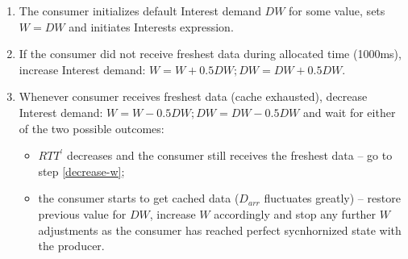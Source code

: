 \documentclass{icn/sig-alternate-2012} %
\newcommand{\wConcept}{Interest demand}
\begin{document}
\begin{enumerate}
\item The consumer initializes default \wConcept{} $DW$ for some value, sets $W=DW$ and initiates Interests expression.
\item If the consumer did not receive freshest data during allocated time (1000ms), increase \wConcept{}: $W=W+0.5DW; DW = DW+0.5DW$.
\item \label{decrease-w} Whenever consumer receives freshest data (cache exhausted), decrease \wConcept{}: $W=W-0.5DW; DW = DW-0.5DW$ and wait for either of the two possible outcomes:
\begin{itemize}
\item $RTT^\prime$ decreases and the consumer still receives the freshest data -- go to step \ref{decrease-w};
\item the consumer starts to get cached data ($D_{arr}$ fluctuates greatly) -- restore previous value for $DW$, increase $W$ accordingly and stop any further $W$ adjustments as the consumer has reached perfect sycnhornized state with the producer.
\end{itemize}
\end{enumerate}








\end{document}
